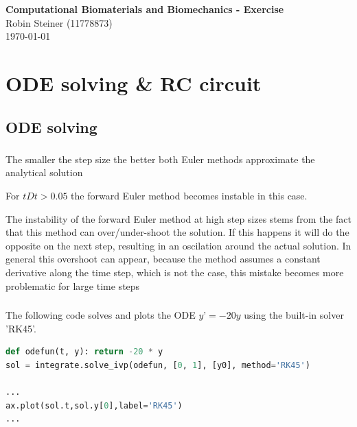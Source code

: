 \documentclass{article}
\begin{document}
    \begin{center}
        \textbf{\Large Computational Biomaterials and Biomechanics - Exercise} \\
        \vspace{0.2cm}
        Robin Steiner (11778873)\\
        \vspace{0.2cm}
        \today \\
    \end{center}


    \section{ODE solving \& RC circuit}

    \subsection{ODE solving}

    \subsubsection{}
    The smaller the step size the better both Euler methods approximate the analytical solution

    \vspace{10pt}
    For $tDt > 0.05$ the forward Euler method becomes instable in this case.

    \vspace{10pt}
    The instability of the forward Euler method at high step sizes stems from the fact that this method can over/under-shoot the solution.
    If this happens it will do the opposite on the next step, resulting in an oscilation around the actual solution.
    In general this overshoot can appear, because the method assumes a constant derivative along the time step, which is not the case,
    this mistake becomes more problematic for large time steps

    \subsubsection{}
    The following code solves and plots the ODE $y’=-20y$ using the built-in solver 'RK45'.
    \begin{lstlisting}[language=Python, style=mystyle]
def odefun(t, y): return -20 * y
sol = integrate.solve_ivp(odefun, [0, 1], [y0], method='RK45')

...
ax.plot(sol.t,sol.y[0],label='RK45')
...
    \end{lstlisting}
\end{document}
